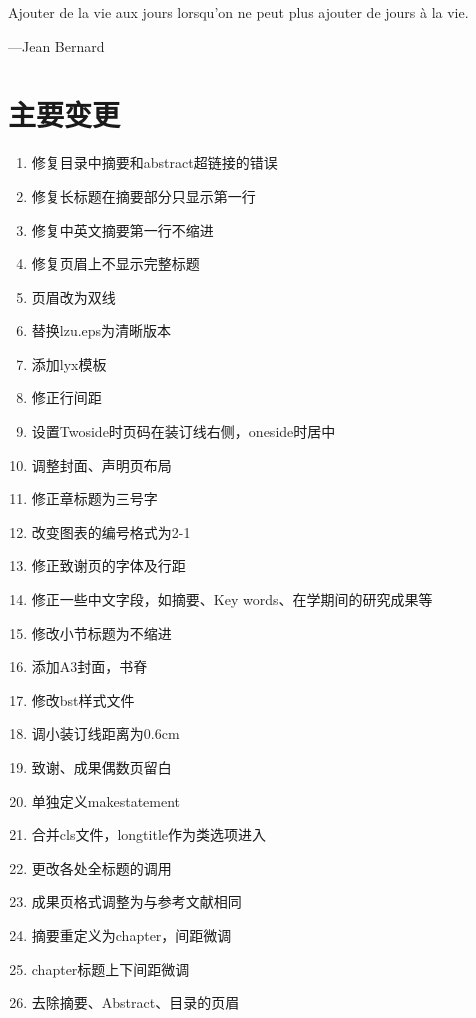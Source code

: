 \documentclass[twoside,longtitle]{LZUthesis}
\begin{document}
\begin{thanks}
Ajouter de la vie aux jours lorsqu'on ne peut plus ajouter de jours
à la vie.

\begin{flushright}
---Jean Bernard
\par\end{flushright}
\end{thanks}


\chapter{主要变更\label{chap:changelog}}
\begin{enumerate}
\item 修复目录中摘要和abstract超链接的错误
\item 修复长标题在摘要部分只显示第一行
\item 修复中英文摘要第一行不缩进
\item 修复页眉上不显示完整标题
\item 页眉改为双线
\item 替换lzu.eps为清晰版本
\item 添加lyx模板
\item 修正行间距
\item 设置Twoside时页码在装订线右侧，oneside时居中
\item 调整封面、声明页布局
\item 修正章标题为三号字
\item 改变图表的编号格式为2-1
\item 修正致谢页的字体及行距
\item 修正一些中文字段，如摘要、Key words、在学期间的研究成果等
\item 修改小节标题为不缩进
\item 添加A3封面，书脊
\item 修改bst样式文件
\item 调小装订线距离为0.6cm
\item 致谢、成果偶数页留白
\item 单独定义makestatement
\item 合并cls文件，longtitle作为类选项进入
\item 更改各处全标题的调用
\item 成果页格式调整为与参考文献相同
\item 摘要重定义为chapter，间距微调
\item chapter标题上下间距微调
\item 去除摘要、Abstract、目录的页眉
\end{enumerate}
\end{document}
